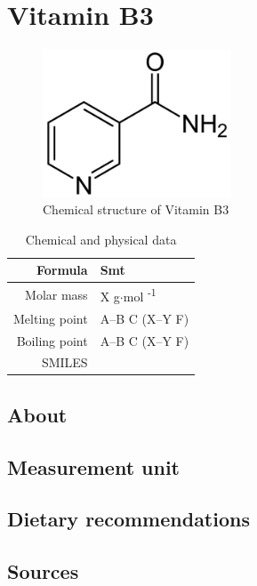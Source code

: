 \documentclass{book}
\begin{document}
\chapter{Vitamin B3}
\begin{figure}[h]
	\caption{Chemical structure of Vitamin B3}
	\centering \includegraphics[width=0.5\textwidth]{images/Vitamin_B3_chemical_structure}
\end{figure}

\begin{table}[h]
	\caption{Chemical and physical data}
	\centering \begin{tabular}{| r | l |}
		\hline
		Formula & Smt\\ \hline
		Molar mass & X g$\cdot$mol \textsuperscript{-1}\\ \hline
		Melting point & A--B \degree C (X--Y \degree F)\\ \hline
		Boiling point & A--B \degree C (X--Y \degree F)\\ \hline
		SMILES & \\ \hline
	\end{tabular}
\end{table}
\newpage

\section{About}


\section{Measurement unit}


\section{Dietary recommendations}


\section{Sources}
\end{document}
